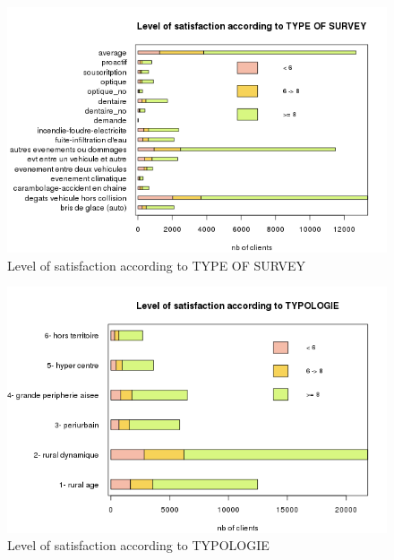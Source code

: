 \documentclass[a4paper, 11pt]{article}
\begin{document}
    \begin{figure}[!ht]
    	\centering
            \includegraphics[height = 10 cm]{Remi/Level_of_satisfaction_according_to_TYPE_OF_SURVEY.png}
            \caption{Level of satisfaction according to TYPE OF SURVEY}
            \label{fig:TYPE_OF_SURVEY}
    \end{figure}
    
    \begin{figure}[!ht]
    	\centering
            \includegraphics[height = 10 cm]{Remi/Level_of_satisfaction_according_to_TYPOLOGIE.png}
            \caption{Level of satisfaction according to TYPOLOGIE}
            \label{fig:TYPOLOGIE}
    \end{figure}
\end{document}
